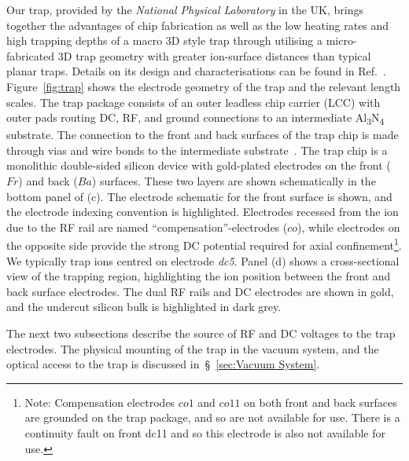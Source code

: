     Our trap, provided by the \emph{National Physical Laboratory} in the UK,
    brings together the
    advantages of chip fabrication as well as the low heating rates and high
    trapping depths of a macro 3D style trap
    through utilising a micro-fabricated 3D trap geometry with greater ion-surface distances than typical planar traps.
    Details on its design and characterisations can be found in Ref.~\cite{see_fabrication_2013,
    wilpers_monolithic_2012, choonee_silicon_2017}. Figure~\ref{fig:trap} shows the electrode geometry of the trap and the relevant length scales.
    The trap package consists of an outer leadless chip carrier (LCC) with outer
    pads routing DC, RF, and ground connections to an intermediate
    Al\textsubscript{3}N\textsubscript{4} substrate. The connection to the front
    and back surfaces of the trap chip is made through vias and wire bonds to
    the intermediate substrate~\cite{wilpers_compact_2013}. The trap chip 
    is a monolithic double-sided silicon device with gold-plated electrodes on
    the front ($Fr$) and back ($Ba$) surfaces. These two layers are shown
    schematically in the bottom panel of (c). The electrode schematic for the
    front surface is shown, and the electrode indexing convention is
    highlighted. Electrodes recessed from the ion due to the RF rail are named
    ``compensation''-electrodes ($co$), while electrodes on the opposite side
    provide the strong DC potential required for axial
    confinement\footnote{Note: Compensation electrodes $co1$ and $co11$ on both
    front and back surfaces are grounded on the trap package, and so are not
    available for use. There is a continuity fault on front dc11 and so this
    electrode is also not available for use.}.
    We typically
    trap ions centred on electrode \textit{dc5}. Panel (d) shows a cross-sectional view of the
    trapping region, highlighting the ion position between the front and back
    surface electrodes. The dual RF rails and DC electrodes are shown in gold,
    and the undercut silicon bulk is highlighted in dark grey.

    The next two subsections describe the source of RF and DC voltages to the trap
    electrodes. The physical mounting of the trap in the vacuum system, and the optical access to the
    trap is discussed in~\S~\ref{sec:Vacuum System}.


